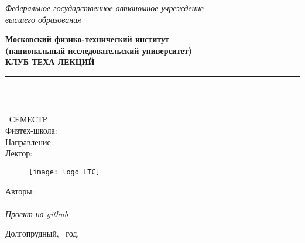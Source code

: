 \begin{titlepage}
	\clearpage\thispagestyle{empty}
	\centering
	
	\textit{Федеральное государственное автономное учреждение \\
		высшего образования}
	\vspace{0.5ex}
	
	\textbf{Московский физико-технический институт
    \\
    (национальный исследовательский университет)
    \\
     КЛУБ ТЕХА ЛЕКЦИЙ}
	\vspace{20ex}
	
	\rule{\linewidth}{0.5mm}
	{\textbf{\FullCourseNameFirstPart}}
	\\
	{\textbf{\FullCourseNameSecondPart}}
	\rule{\linewidth}{0.5mm}
	
	\SemesterNumber\ СЕМЕСТР
	\\
	Физтех-школа: \textit{\SchoolName}
	\\
	Направление: \textit{\TrackName}
	\\
	Лектор: \textit{\LecturerInitials}
	\vspace{1ex}
	
	\begin{figure}[!ht]
		\centering
		\texttt{[image: logo\_LTC]}
		\label{fig:my_label}
	\end{figure}
\begin{flushright}
	\noindent
	Авторы: \href{\VKLinkFirst}{\textit{\AutherInitialsFirst}}
	\\
	\href{\VKLinkThird}{\textit{\AutherInitialsThird}}
	\\
	\href{\GithubLink}{\textit{Проект на github}} 
\end{flushright}
	
	\vfill
	Долгопрудный, \CourseDate\ год.
	\pagebreak
	
\end{titlepage}
